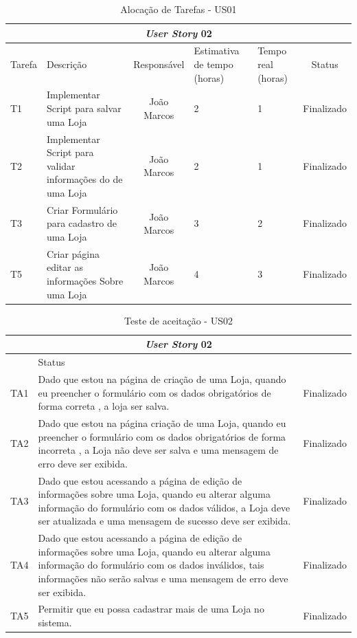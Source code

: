 \documentclass[a4paper,12pt]{monografia}
\begin{document}
\begin{longtable}{|p{1.5cm}|p{3.5cm}|c|p{2cm}|p{2cm}|c|}
\caption{Alocação de Tarefas - US01}
\label{quadro:tat-us03}
\hline
\multicolumn{6}{|c|}{\textbf{\textit{User Story} 02}}\\
\hline		
\rowcolor{ballblue}
Tarefa & Descrição & Responsável & Estimativa de tempo (horas) & Tempo real (horas) & Status\\
\hline
T1 & Implementar Script para salvar uma Loja & João Marcos & 2 & 1 & Finalizado\\
\hline
T2 & Implementar Script para validar informações do de uma Loja & João Marcos & 2 & 1 & Finalizado\\
\hline
T3 & Criar Formulário para cadastro de uma Loja & João Marcos & 3 & 2 & Finalizado\\	
\hline
T5 & Criar página editar as informações Sobre uma Loja & João Marcos & 4 & 3 & Finalizado\\
\hline
\end{longtable}

\begin{longtable}{|l|p{11.8cm}|c|}
\caption{Teste de aceitação - US02}
\label{quadro:teste-aceitacao-us02}
\hline
\multicolumn{3}{|c|}{\textbf{\textit{User Story} 02}}\\
\hline		
\rowcolor{ballblue}
\multicolumn{2}{|c|}{Testes de aceitação} & Status\\	
\hline
TA1 & Dado que estou na página de criação de uma Loja, quando eu preencher o formulário com os dados obrigatórios de forma correta , a loja ser salva.   & Finalizado\\
\hline
TA2 & Dado que estou na página criação de uma Loja, quando eu preencher o formulário com os dados obrigatórios de forma incorreta , a Loja não deve ser salva e uma mensagem de erro deve ser exibida.   & Finalizado\\
\hline
TA3 & Dado que estou acessando a página de edição de informações sobre uma Loja, quando eu alterar alguma informação do formulário com os dados válidos, a Loja deve ser atualizada e uma mensagem de sucesso deve ser exibida.   & Finalizado\\
\hline
TA4 & Dado que estou acessando a página de edição de informações sobre uma Loja, quando eu alterar alguma informação do formulário com os dados inválidos, tais informações não serão salvas e uma mensagem de erro deve ser exibida.   & Finalizado\\
\hline	
TA5 & Permitir que eu possa cadastrar mais de uma Loja no sistema.  & Finalizado\\
\hline	
\end{longtable}
\end{document}
